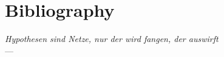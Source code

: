 

%
\chapter*{Bibliography}

\begin{flushright}{\slshape
    Hypothesen sind Netze, nur der wird fangen, der auswirft} \\ \medskip
    --- \textcite{novalis_novalis_1837}
\end{flushright}

\printbibliography[
heading=none
]

%
\manualmark
\markboth{\spacedlowsmallcaps{\bibname}}{\spacedlowsmallcaps{\bibname}}
%
